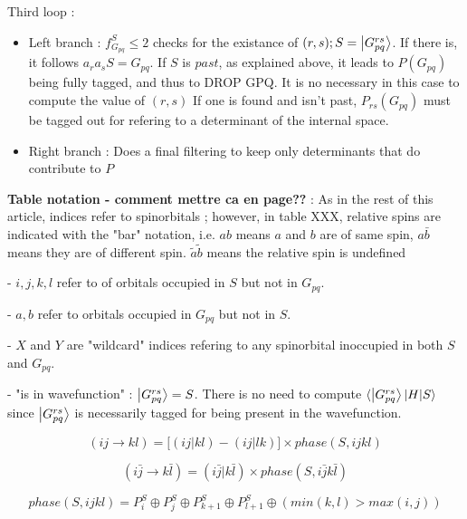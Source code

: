 \documentclass[./thesis.tex]{subfiles}
\begin{document}
Third loop :
\begin{itemize}

\item
Left branch : $f_{G_{pq}}^S \leq 2$ checks for the existance of $(r,s) ;S=\ket {G_{pq}^{rs}}$. 
If there is, it follows $a_r a_s S = G_{pq}$. If $S$ is $past$, as explained above, it leads to $P(G_{pq})$ being fully tagged, and thus to DROP GPQ. It is no necessary in this case to compute the value of $(r,s)$
If one is found and isn't past, $P_{rs}(G_{pq})$ must be tagged out for refering to a determinant of the internal space.
\item
Right branch :
Does a final filtering to keep only determinants that do contribute to $P$
\end{itemize}



\textbf{Table notation - comment mettre ca en page??} : As in the rest of this article, indices refer to spinorbitals ; however, in table XXX, relative spins are indicated with the "bar" notation, i.e. $ab$ means $a$ and $b$ are of same spin, $a\bar b$ means they are of different spin. $\tilde a \tilde b$ means the relative spin is undefined

- $i,j,k,l$ refer to of orbitals occupied in $S$ but not in $G_{pq}$.

- $a,b$ refer to orbitals occupied in $G_{pq}$ but not in $S$.

- $X$ and $Y$ are "wildcard" indices refering to any spinorbital inoccupied in both $S$ and $G_{pq}$.

- "is in wavefunction" : $\ket {G_{pq}^{rs}} = S$. There is no need to compute $\langle \ket {G_{pq}^{rs}}|H|S \rangle$ since $\ket {G_{pq}^{rs}}$ is necessarily tagged for being present in the wavefunction.



\begin{equation}
(ij \rightarrow kl) = \big [(ij|kl) - (ij|lk) \big ] \times phase(S,ijkl)
\end{equation}


\begin{equation}
(i\bar j \rightarrow k\bar l) = (i\bar j|k\bar l) \times phase(S,i\bar jk\bar l)
\end{equation}




\begin{equation}
phase(S,ijkl) = P^S_i \oplus P^S_j \oplus P^S_{k+1} \oplus P^S_{l+1} \oplus (min(k,l)>max(i,j))
\end{equation}
\end{document}
